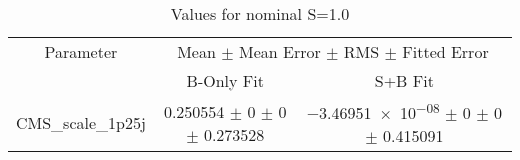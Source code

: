 \begin{table}
\centering
\caption{Values for nominal S=1.0}
\begin{tabular}{ccc}
\toprule
Parameter & \multicolumn{2}{c}{Mean $\pm$ Mean Error $\pm$ RMS $\pm$ Fitted Error}\\
 & B-Only Fit & S+B Fit\\
\midrule
CMS\_scale\_1p25j & \num{0.250554} $\pm$ \num{0} $\pm$ \num{0} $\pm$ \num{0.273528} & \num{-3.46951e-08} $\pm$ \num{0} $\pm$ \num{0} $\pm$ \num{0.415091}\\
\bottomrule
\end{tabular}
\end{table}